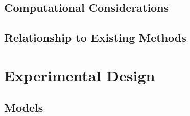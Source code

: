 \documentclass[a4paper,oneside,10pt,ngerman,english]{scrbook}
\begin{document}
\section{Computational Considerations}
\section{Relationship to Existing Methods}


\chapter{Experimental Design}
\label{ch:exp-design}
\section{Models}
\end{document}
